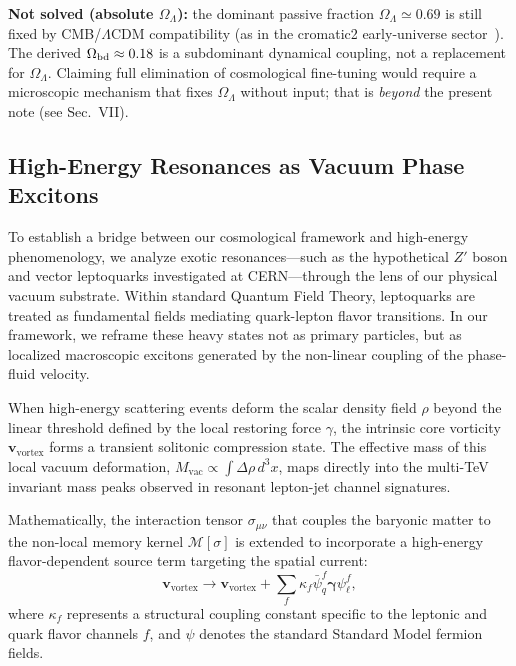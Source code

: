 \documentclass[prd,
               reprint,
               aps,
               preprintnumbers,
               nofootinbib,
               longbibliography,
               floatfix]{revtex4-2}
\begin{document}
\textbf{Not solved (absolute $\Omega_\Lambda$):} the
dominant passive fraction $\Omega_\Lambda\simeq 0.69$
is still fixed by CMB/$\Lambda$CDM compatibility
(as in the cromatic2 early-universe
sector~\cite{cromatic2zenodo}).
The derived $\Omega_{\rm bd}\approx 0.18$ is a
subdominant dynamical coupling, not a replacement
for $\Omega_\Lambda$.
Claiming full elimination of cosmological fine-tuning
would require a microscopic mechanism that fixes
$\Omega_\Lambda$ without input; that is \emph{beyond}
the present note (see Sec.~VII).


\subsection{High-Energy Resonances as Vacuum Phase Excitons}
\label{sec:high_energy_cern}

To establish a bridge between our cosmological framework and
high-energy phenomenology, we analyze exotic resonances---such
as the hypothetical $Z'$ boson and vector leptoquarks
investigated at CERN---through the lens of our physical vacuum
substrate. Within standard Quantum Field Theory, leptoquarks
are treated as fundamental fields mediating quark-lepton flavor
transitions. In our framework, we reframe these heavy states
not as primary particles, but as localized macroscopic excitons
generated by the non-linear coupling of the phase-fluid
velocity.

When high-energy scattering events deform the scalar density
field $\rho$ beyond the linear threshold defined by the local
restoring force $\gamma$, the intrinsic core vorticity
$\mathbf{v}_{\text{vortex}}$ forms a transient solitonic
compression state. The effective mass of this local vacuum
deformation, $M_{\text{vac}} \propto \int \Delta \rho \, d^3x$,
maps directly into the multi-TeV invariant mass peaks observed
in resonant lepton-jet channel signatures.

Mathematically, the interaction tensor $\sigma_{\mu\nu}$ that
couples the baryonic matter to the non-local memory kernel
$\mathcal{M}[\sigma]$ is extended to incorporate a high-energy
flavor-dependent source term targeting the spatial current:
\begin{equation}
\mathbf{v}_{\text{vortex}} \longrightarrow
\mathbf{v}_{\text{vortex}} + \sum_{f} \kappa_f 
\bar{\psi}_q^f \boldsymbol{\gamma} \psi_\ell^f,
\end{equation}
where $\kappa_f$ represents a structural coupling constant
specific to the leptonic and quark flavor channels $f$, and
$\psi$ denotes the standard Standard Model fermion fields.
\end{document}

